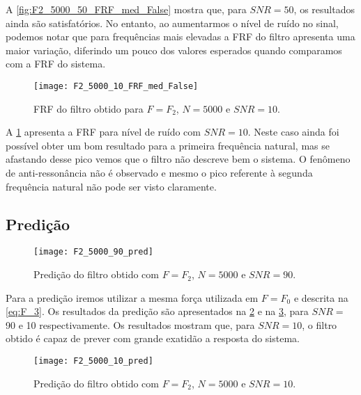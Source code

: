 A \cref{fig:F2_5000_50_FRF_med_False} mostra que, para $ SNR=50 $, os resultados ainda são satisfatórios. No entanto, ao aumentarmos o nível de ruído no sinal, podemos notar que para frequências mais elevadas a FRF do filtro apresenta uma maior variação, diferindo um pouco dos valores esperados quando comparamos com a FRF do sistema.

\begin{figure}
	\centering
	\texttt{[image: F2\_5000\_10\_FRF\_med\_False]}
	\caption{FRF do filtro obtido para $ F=F_2 $, $ N=5000 $ e $ SNR=10 $.}
	\label{fig:F2_5000_10_FRF_med_False}
\end{figure}

A \cref{fig:F2_5000_10_FRF_med_False} apresenta a FRF para nível de ruído com $ SNR=10 $. Neste caso ainda foi possível obter um bom resultado para a primeira frequência natural, mas se afastando desse pico vemos que o filtro não descreve bem o sistema. O fenômeno de anti-ressonância não é observado e mesmo o pico referente à segunda frequência natural não pode ser visto claramente.

\subsection{Predição}

\begin{figure}
	\centering
	\texttt{[image: F2\_5000\_90\_pred]}
	\caption{Predição do filtro obtido com $ F=F_2 $, $ N=5000 $ e $ SNR=90 $.}
	\label{fig:F2_5000_90_pred}
\end{figure}

Para a predição iremos utilizar a mesma força utilizada em $ F=F_0 $ e descrita na \ref{eq:F_3}. Os resultados da predição são apresentados na \cref{fig:F2_5000_90_pred} e na \cref{fig:F2_5000_10_pred}, para $ SNR= $ 90 e 10 respectivamente. Os resultados mostram que, para $ SNR=10 $, o filtro obtido é capaz de prever com grande exatidão a resposta do sistema.  

\begin{figure}
	\centering
	\texttt{[image: F2\_5000\_10\_pred]}
	\caption{Predição do filtro obtido com $ F=F_2 $, $ N=5000 $ e $ SNR=10 $.}
	\label{fig:F2_5000_10_pred}
\end{figure}
